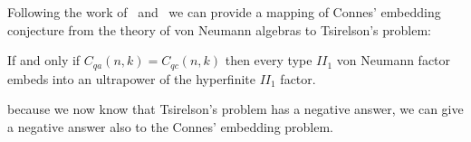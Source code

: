 Following the work of~\cite{Tsirelson_1} and~\cite{Tsirelson_2} we can provide a mapping of Connes' embedding conjecture from the theory of von Neumann algebras to Tsirelson's problem:

\begin{theorem}
If and only if $C_{q a}(n, k) = C_{q c}(n, k)$ then every type $II_1$ von Neumann factor embeds into an ultrapower of the hyperfinite $II_1$ factor.
\end{theorem}

because we now know that Tsirelson's problem has a negative answer, we can give a negative answer also to the Connes' embedding problem.

